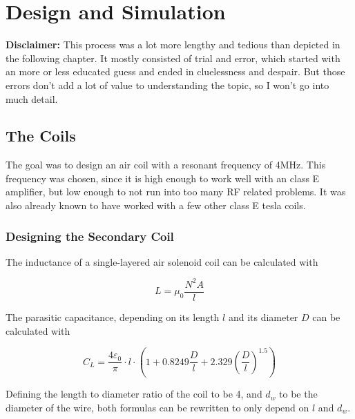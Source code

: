 \setchapterpreamble[u]{\margintoc}

\chapter{Design and Simulation} %

\textbf{Disclaimer:} This process was a lot more lengthy and tedious than depicted in the following chapter. It mostly consisted of trial and error, which started with an more or less educated guess and ended in cluelessness and despair. But those errors don't add a lot of value to understanding the topic, so I won't go into much detail.

\section{The Coils}

The goal was to design an air coil with a resonant frequency of 4MHz. This frequency was chosen, since it is high enough to work well with an class E amplifier, but low enough to not run into too many RF related problems. It was also already known to have worked with a few other class E tesla coils.

\subsection{Designing the Secondary Coil}
\label{subsec:designing-the-secondary-coil}

The inductance of a single-layered air solenoid coil can be calculated with

\begin{equation}\label{eq-inductivity}
    L = \mu_0 \frac{N^2 A}{l}
\end{equation}

The parasitic capacitance, depending on its length \(l\) and its diameter \(D\) can be calculated with

\begin{equation}\label{eq-parasitic-capacitance}
    C_L = \frac{4\varepsilon_0}{\pi} \cdot l \cdot \left( 1 + 0.8249 \frac{D}{l} + 2.329 \left(\frac{D}{l}\right)^{1.5}\right)
\end{equation}

Defining the length to diameter ratio of the coil to be 4, and \(d_w\) to be the diameter of the wire, both formulas can be rewritten to only depend on \(l\) and \(d_w\). 

